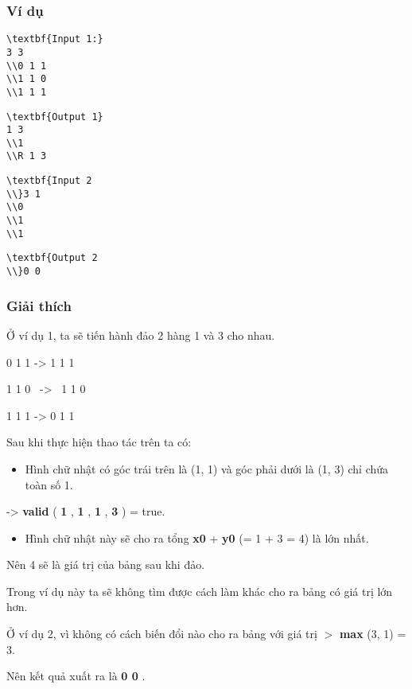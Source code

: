\subsubsection{   Ví dụ  }
\begin{verbatim}
\textbf{Input 1:}
3 3
\\0 1 1
\\1 1 0
\\1 1 1
\end{verbatim}
\begin{verbatim}
\textbf{Output 1}
1 3
\\1
\\R 1 3
\end{verbatim}
\begin{verbatim}
\textbf{Input 2
\\}3 1
\\0
\\1
\\1\end{verbatim}
\begin{verbatim}
\textbf{Output 2
\\}0 0\end{verbatim}

\subsubsection{   Giải thích  }

   Ở ví dụ 1, ta sẽ tiến hành đảo 2 hàng 1 và 3 cho nhau.  

    0 1 1      ->   1 1 1

   1 1 0  ->  1 1 0  

1 1 1   ->       0 1 1   

   Sau khi thực hiện thao tác trên ta có:  
\begin{itemize}
	\item     Hình chữ nhật có góc trái trên là (1, 1) và góc phải dưới là (1, 3) chỉ chứa toàn số 1.   
\end{itemize}

   ->   \textbf{    valid   }   (   \textbf{    1   }   ,   \textbf{    1   }   ,   \textbf{    1   }   ,   \textbf{    3   }   ) = true.  
\begin{itemize}
	\item     Hình chữ nhật này sẽ cho ra tổng    \textbf{     x0    }    +    \textbf{     y0    }    (= 1 + 3 = 4) là lớn nhất.   
\end{itemize}

   Nên 4 sẽ là giá trị của bảng sau khi đảo.  

   Trong ví dụ này ta sẽ không tìm được cách làm khác cho ra bảng có giá trị lớn hơn.  

   Ở ví dụ 2, vì không có cách biến đổi nào cho ra bảng với giá trị   \textbf{}\textbf{    $>$   }\textbf{    max   }   (3, 1) = 3.  

   Nên kết quả xuất ra là   \textbf{    0 0   }   .  
